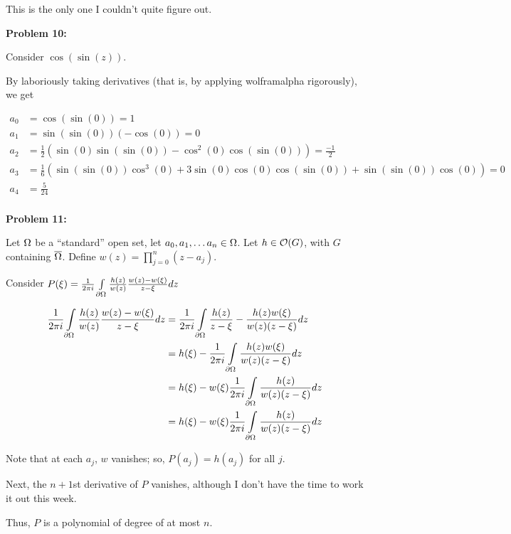 \documentclass[a4paper,12pt]{article}
\begin{document}
This is the only one I couldn't quite figure out. 

\shunt

{\bf Problem 10:}

Consider $\cos(\sin(z))$.

By laboriously taking derivatives (that is, by applying wolframalpha rigorously), we get

\begin{align*}
a_0 &= \cos(\sin(0)) = 1\\
a_1 &= \sin(\sin(0))(-\cos(0)) = 0\\
a_2 &= \frac{1}{2}(\sin(0)\sin(\sin(0)) - \cos^2(0)\cos(\sin(0))) = \frac{-1}{2}\\
a_3 &= \frac{1}{6}(\sin(\sin(0))\cos^3(0)+ 3\sin(0)\cos(0)\cos(\sin(0)) + \sin(\sin(0))\cos(0)) = 0\\
a_4 &= \frac{5}{24}\\
\end{align*}

\shunt

{\bf Problem 11:}

Let $\Omega$ be a ``standard'' open set, let $a_0, a_1, \ldots a_n \in \Omega$. Let $h \in \mathcal{O}(G)$, with $G$ containing $\overline{\Omega}$. Define $w(z) = \prod\limits_{j=0}^n (z-a_j)$.

Consider $P(\xi) = \frac{1}{2\pi i}\int\limits_{\partial \Omega} \frac{h(z)}{w(z)} \frac{w(z)-w(\xi)}{z-\xi} dz$

\begin{align*}
\frac{1}{2\pi i} \int\limits_{\partial \Omega} \frac{h(z)}{w(z)} \frac{w(z)-w(\xi)}{z-\xi} dz &= \frac{1}{2\pi i} \int\limits_{\partial \Omega} \frac{h(z)}{z-\xi} - \frac{h(z)w(\xi)}{w(z)(z-\xi)} dz\\
&= h(\xi) - \frac{1}{2\pi i}\int\limits_{\partial \Omega} \frac{h(z)w(\xi)}{w(z)(z-\xi)} dz\\
&= h(\xi) - w(\xi)\frac{1}{2\pi i}\int\limits_{\partial \Omega} \frac{h(z)}{w(z)(z-\xi)} dz\\
&= h(\xi) - w(\xi)\frac{1}{2\pi i}\int\limits_{\partial \Omega} \frac{h(z)}{w(z)(z-\xi)} dz\\
\end{align*}

Note that at each $a_j$, $w$ vanishes; so, $P(a_j) = h(a_j)$ for all $j$.

Next, the $n+1$st derivative of $P$ vanishes, although I don't have the time to work it out this week.

Thus, $P$ is a polynomial of degree of at most $n$.

\shunt
\end{document}
